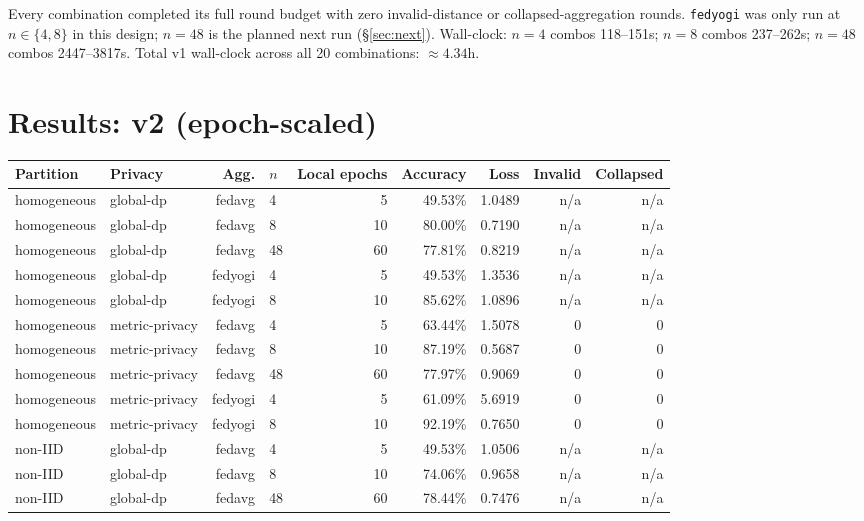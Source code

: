 \documentclass[11pt]{article}
\newcommand{\code}[1]{\texttt{#1}}
\begin{document}
\noindent Every combination completed its full round budget with zero invalid-distance or
collapsed-aggregation rounds. \code{fedyogi} was only run at $n \in \{4,8\}$ in this design;
$n{=}48$ is the planned next run (\S\ref{sec:next}). Wall-clock: $n{=}4$ combos 118--151s;
$n{=}8$ combos 237--262s; $n{=}48$ combos 2447--3817s. Total v1 wall-clock across all 20
combinations: $\approx 4.34$h.

\section{Results: v2 (epoch-scaled)}
\label{sec:v2}

\begin{table}[h]
\centering
\footnotesize
\begin{tabular}{llrlrrrrr}
\toprule
Partition & Privacy & Agg. & $n$ & Local epochs & Accuracy & Loss & Invalid & Collapsed \\
\midrule
homogeneous & global-dp      & fedavg  & 4  & 5  & 49.53\% & 1.0489 & n/a & n/a \\
homogeneous & global-dp      & fedavg  & 8  & 10 & 80.00\% & 0.7190 & n/a & n/a \\
homogeneous & global-dp      & fedavg  & 48 & 60 & 77.81\% & 0.8219 & n/a & n/a \\
homogeneous & global-dp      & fedyogi & 4  & 5  & 49.53\% & 1.3536 & n/a & n/a \\
homogeneous & global-dp      & fedyogi & 8  & 10 & 85.62\% & 1.0896 & n/a & n/a \\
homogeneous & metric-privacy & fedavg  & 4  & 5  & 63.44\% & 1.5078 & 0 & 0 \\
homogeneous & metric-privacy & fedavg  & 8  & 10 & 87.19\% & 0.5687 & 0 & 0 \\
homogeneous & metric-privacy & fedavg  & 48 & 60 & 77.97\% & 0.9069 & 0 & 0 \\
homogeneous & metric-privacy & fedyogi & 4  & 5  & 61.09\% & 5.6919 & 0 & 0 \\
homogeneous & metric-privacy & fedyogi & 8  & 10 & 92.19\% & 0.7650 & 0 & 0 \\
non-IID     & global-dp      & fedavg  & 4  & 5  & 49.53\% & 1.0506 & n/a & n/a \\
non-IID     & global-dp      & fedavg  & 8  & 10 & 74.06\% & 0.9658 & n/a & n/a \\
non-IID     & global-dp      & fedavg  & 48 & 60 & 78.44\% & 0.7476 & n/a & n/a \\

\end{tabular}
\end{table}
\end{document}
